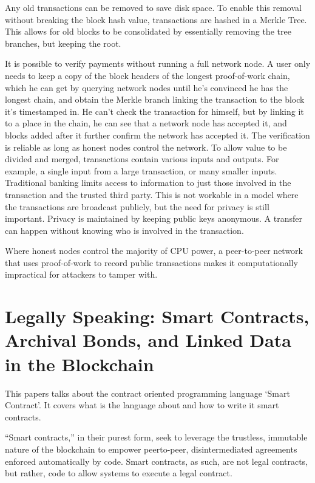 Any old transactions can be removed to save disk space. To enable this removal without breaking the block hash value, transactions are hashed in a Merkle Tree. This allows for old blocks to be consolidated by essentially removing the tree branches, but keeping the root.

It is possible to verify payments without running a full network node. A user only needs to keep a copy of the block headers of the longest proof-of-work chain, which he can get by querying network nodes until he’s convinced he has the longest chain, and obtain the Merkle branch linking the transaction to the block it’s timestamped in. He can’t check the transaction for himself, but by linking it to a place in the chain, he can see that a network node has accepted it, and blocks added after it further confirm the network has accepted it. The verification is reliable as long as honest nodes control the network. To allow value to be divided and merged, transactions contain various inputs and outputs. For example, a single input from a large transaction, or many smaller inputs. 
Traditional banking limits access to information to just those involved in the transaction and the trusted third party. This is not workable in a model where the transactions are broadcast publicly, but the need for privacy is still important. Privacy is maintained by keeping public keys anonymous. A transfer can happen without knowing who is involved in the transaction. 

Where honest nodes control the majority of CPU power, a peer-to-peer network that uses proof-of-work to record public transactions makes it computationally impractical for attackers to tamper with.

\section {\textbf{ Legally Speaking: Smart Contracts,    Archival Bonds, and Linked Data in the Blockchain}}
	      This papers talks about the contract oriented programming language ‘Smart Contract'. It covers what is the language about and how to write it smart contracts.
	      	      
	      “Smart contracts,” in their purest form, seek to leverage the
	      trustless, immutable nature of the blockchain to empower peerto-peer,
	      disintermediated agreements enforced automatically
	      by code. Smart contracts, as such, are not legal contracts, but
	      rather, code to allow systems to execute a legal contract. 
	      
